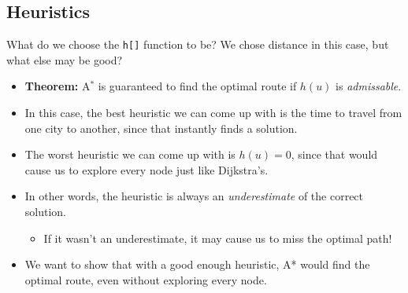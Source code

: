 \documentclass[10pt]{article}
\begin{document}
\subsection*{Heuristics}
What do we choose the \texttt{h[]} function to be?  We chose distance in this case, but what else may be good?
\begin{itemize}
	\item \textbf{Theorem:} A$^*$ is guaranteed to find the optimal route if $h(u)$ is \textit{admissable}.
	\item In this case, the best heuristic we can come up with is the time to travel from one city to another, since that instantly finds a solution.
	\item The worst heuristic we can come up with is $h(u) = 0$, since that would cause us to explore every node just like Dijkstra's.
	\item In other words, the heuristic is always an \textit{underestimate} of the correct solution.
	\begin{itemize}
	    \item If it wasn't an underestimate, it may cause us to miss the optimal path!
    \end{itemize}
    \item We want to show that with a good enough heuristic, A* would find the optimal route, even without exploring every node.
\end{itemize}
\end{document}
